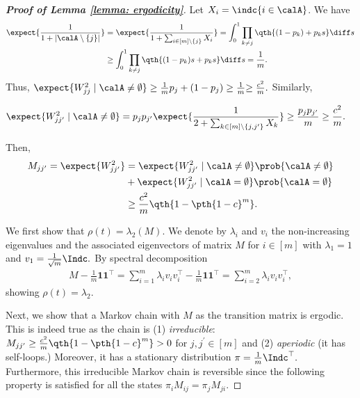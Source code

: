 \documentclass[letterpaper, 10 pt, conference]{ieeeconf}  %
\begin{document}
\begin{proof}[\bf Proof of Lemma \ref{lemma: ergodicity}]
Let $X_i = \indc{i\in \calA}$. 
We have 
\begin{align*}
\expect{\frac{1}{1+|\calA \setminus \{j\}|}} & = \expect{\frac{1}{1+\sum_{i\in [m]\setminus \{j\}} X_i}} = \int_{0}^1 \prod_{k\not=j}\qth{(1-p_k) + p_k s}\diff s \\ 
&\ge \int_{0}^1 \prod_{k\not=j}\qth{(1-p_k)s + p_k s}\diff s =\frac{1}{m}. 
\end{align*}
Thus, 
$
\expect{W^2_{jj}\mid\calA\neq \emptyset} \ge \frac{1}{m} p_j + (1-p_j) \ge \frac{1}{m}{ \ge \frac{c^2}{m}}.      
$
Similarly, 
\begin{small}
\begin{align*}
\expect{W^2_{jj^{\prime}}\mid \calA \neq \emptyset} & = p_j p_{j^{\prime}} \expect{\frac{1}{2+ \sum_{k\in [m]\setminus \{j, j^{\prime}\}}X_k }} \ge \frac{ p_j p_{j^{\prime}}}{m} \ge \frac{c^2}{m}. 
\end{align*}
\end{small}
Then, 
\begin{align*}
M_{jj^{\prime}}=\expect{W^2_{jj^\prime}} & = \expect{W^2_{jj^\prime}\mid \calA \neq\emptyset}\prob{\calA \neq\emptyset}\\
&+\expect{W^2_{jj^\prime}\mid \calA =\emptyset}\prob{\calA =\emptyset}\\
&\ge \frac{c^2}{m}\qth{1-\pth{1-c}^m}.
\end{align*}

We first show that $\rho (t) = \lambda_2 (M).$ 
We denote by $\lambda_i$ and $v_i$ the non-increasing eigenvalues and the associated eigenvectors of matrix $M$ for $i\in [m]$ with $\lambda_1 = 1$ and $v_1 = \frac{1}{\sqrt{m}}\Indc.$
By spectral decomposition
\begin{align*}
    M - \frac{1}{m}\bm{1}\bm{1}^{\top} = \sum_{i=1}^{m} \lambda_i v_i v_i^\top - \frac{1}{m}\bm{1}\bm{1}^{\top} = \sum_{i=2}^{m} \lambda_i v_i v_i^\top, 
\end{align*}
showing $\rho(t) = \lambda_2.$

Next, we show that a Markov chain with $M$ as the transition matrix is ergodic. 
This is indeed true as the chain is (1) {\it irreducible}: $M_{j j^\prime}\ge  \frac{c^2}{m}\qth{1-\pth{1-c}^m}>0$ for $j,j^\prime \in[m]$ and (2) {\it aperiodic} (it has self-loops.) Moreover, it has a stationary distribution
$
\pi = \frac{1}{m}\Indc^\top.
$
Furthermore, this irreducible Markov chain is reversible since the following property is satisfied for all the states
$
\pi_i M_{ij} = \pi_j M_{ji}.
$


\end{proof}
\end{document}
